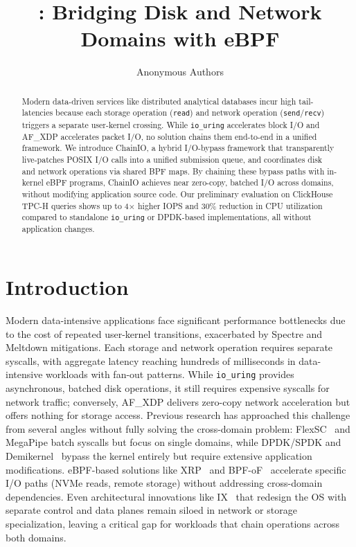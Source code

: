 \documentclass[sigconf,10pt]{acmart}
\title{\sys: Bridging Disk and Network Domains with eBPF}
\author{
Anonymous Authors
}
\newcommand{\sys}{ChainIO\xspace}
\begin{document}
\begin{abstract}
Modern data-driven services like distributed analytical databases incur high tail-latencies because each storage operation (\texttt{read}) and network operation (\texttt{send}/\texttt{recv}) triggers a separate user-kernel crossing. While \texttt{io\_uring} accelerates block I/O and AF\_XDP accelerates packet I/O, no solution chains them end-to-end in a unified framework. We introduce \sys, a hybrid I/O-bypass framework that transparently live-patches POSIX I/O calls into a unified submission queue, and coordinates disk and network operations via shared BPF maps. By chaining these bypass paths with in-kernel eBPF programs, \sys achieves near zero-copy, batched I/O across domains, without modifying application source code. Our preliminary evaluation on ClickHouse TPC-H queries shows up to 4× higher IOPS and 30\% reduction in CPU utilization compared to standalone \texttt{io\_uring} or DPDK-based implementations, all without application changes.
\end{abstract}

\maketitle

\section{Introduction}

Modern data-intensive applications face significant performance bottlenecks due to the cost of repeated user-kernel transitions, exacerbated by Spectre and Meltdown mitigations. Each storage and network operation requires separate syscalls, with aggregate latency reaching hundreds of milliseconds in data-intensive workloads with fan-out patterns. While \texttt{io\_uring} provides asynchronous, batched disk operations, it still requires expensive syscalls for network traffic; conversely, AF\_XDP delivers zero-copy network acceleration but offers nothing for storage access. Previous research has approached this challenge from several angles without fully solving the cross-domain problem: FlexSC~\cite{flexsc} and MegaPipe batch syscalls but focus on single domains, while DPDK/SPDK and Demikernel~\cite{zhang2021demikernel} bypass the kernel entirely but require extensive application modifications. eBPF-based solutions like XRP~\cite{Zhong22} and BPF-oF~\cite{zarkadas2023bpf} accelerate specific I/O paths (NVMe reads, remote storage) without addressing cross-domain dependencies. Even architectural innovations like IX~\cite{ix} that redesign the OS with separate control and data planes remain siloed in network or storage specialization, leaving a critical gap for workloads that chain operations across both domains.
\end{document}
